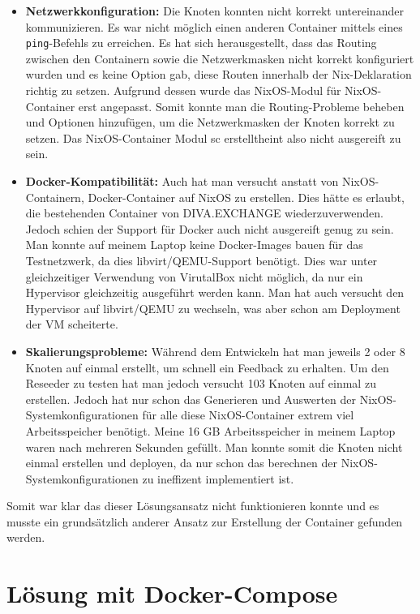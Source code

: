 \begin{itemize}
    \item \textbf{Netzwerkkonfiguration:} Die Knoten konnten nicht korrekt untereinander kommunizieren. Es war nicht möglich einen anderen Container mittels eines \lstinline|ping|-Befehls zu erreichen.
        Es hat sich herausgestellt, dass das Routing zwischen den Containern sowie die Netzwerkmasken nicht korrekt konfiguriert wurden und es keine Option gab,
        diese Routen innerhalb der Nix-Deklaration richtig zu setzen.
        Aufgrund dessen wurde das NixOS-Modul für NixOS-Container erst angepasst.
        Somit konnte man die Routing-Probleme beheben und Optionen hinzufügen, um die Netzwerkmasken der Knoten korrekt zu setzen. %
        Das NixOS-Container Modul sc erstelltheint also nicht ausgereift zu sein.
    \item \textbf{Docker-Kompatibilität:} Auch hat man versucht anstatt von NixOS-Containern, Docker-Container auf NixOS zu erstellen.
        Dies hätte es erlaubt, die bestehenden Container von DIVA.EXCHANGE wiederzuverwenden.
        Jedoch schien der Support für Docker auch nicht ausgereift genug zu sein.
        Man konnte auf meinem Laptop keine Docker-Images bauen für das Testnetzwerk, da dies libvirt/QEMU-Support benötigt.
        Dies war unter gleichzeitiger Verwendung von VirutalBox nicht möglich, da nur ein Hypervisor gleichzeitig ausgeführt werden kann.
        Man hat auch versucht den Hypervisor auf libvirt/QEMU zu wechseln, was aber schon am Deployment der VM scheiterte.
    \item \textbf{Skalierungsprobleme:} Während dem Entwickeln hat man jeweils 2 oder 8 Knoten auf einmal erstellt, um schnell ein Feedback zu erhalten.
        Um den Reseeder zu testen hat man jedoch versucht 103 Knoten auf einmal zu erstellen.
        Jedoch hat nur schon das Generieren und Auswerten der NixOS-Systemkonfigurationen für alle diese NixOS-Container extrem viel Arbeitsspeicher benötigt.
        Meine 16 GB Arbeitsspeicher in meinem Laptop waren nach mehreren Sekunden gefüllt.
        Man konnte somit die Knoten nicht einmal erstellen und deployen, da nur schon das berechnen der NixOS-Systemkonfigurationen zu ineffizent implementiert ist.
\end{itemize}
Somit war klar das dieser Lösungsansatz nicht funktionieren konnte und es musste ein grundsätzlich anderer Ansatz zur Erstellung der Container gefunden werden.

\section{Lösung mit Docker-Compose}

